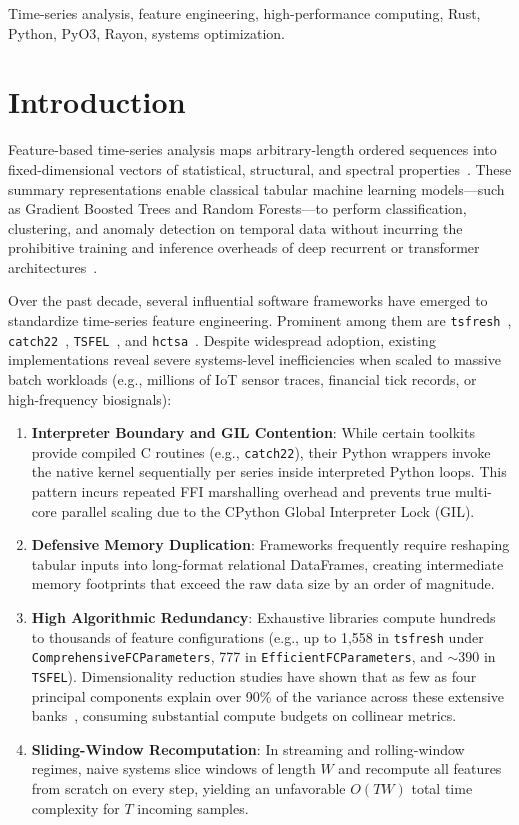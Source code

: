 \documentclass[conference]{IEEEtran}
\newcommand{\tsfresh}{\texttt{tsfresh}}
\newcommand{\catchtwentytwo}{\texttt{catch22}}
\newcommand{\tsfel}{\texttt{TSFEL}}
\newcommand{\hctsa}{\texttt{hctsa}}
\begin{document}
\begin{IEEEkeywords}
Time-series analysis, feature engineering, high-performance computing, Rust, Python, PyO3, Rayon, systems optimization.
\end{IEEEkeywords}

\section{Introduction}
\label{sec:introduction}
Feature-based time-series analysis maps arbitrary-length ordered sequences into fixed-dimensional vectors of statistical, structural, and spectral properties~\cite{fulcher2014highly}. These summary representations enable classical tabular machine learning models---such as Gradient Boosted Trees and Random Forests---to perform classification, clustering, and anomaly detection on temporal data without incurring the prohibitive training and inference overheads of deep recurrent or transformer architectures~\cite{dau2019ucr}.

Over the past decade, several influential software frameworks have emerged to standardize time-series feature engineering. Prominent among them are \tsfresh{}~\cite{christ2018tsfresh}, \catchtwentytwo{}~\cite{lubba2019catch22}, \tsfel{}~\cite{barandas2020tsfel}, and \hctsa{}~\cite{fulcher2014highly}. Despite widespread adoption, existing implementations reveal severe systems-level inefficiencies when scaled to massive batch workloads (e.g., millions of IoT sensor traces, financial tick records, or high-frequency biosignals):
\begin{enumerate}
    \item \textbf{Interpreter Boundary and GIL Contention}: While certain toolkits provide compiled C routines (e.g., \catchtwentytwo{}), their Python wrappers invoke the native kernel sequentially per series inside interpreted Python loops. This pattern incurs repeated FFI marshalling overhead and prevents true multi-core parallel scaling due to the CPython Global Interpreter Lock (GIL).
    \item \textbf{Defensive Memory Duplication}: Frameworks frequently require reshaping tabular inputs into long-format relational DataFrames, creating intermediate memory footprints that exceed the raw data size by an order of magnitude.
    \item \textbf{High Algorithmic Redundancy}: Exhaustive libraries compute hundreds to thousands of feature configurations (e.g., up to 1,558 in \tsfresh{} under \texttt{ComprehensiveFCParameters}, 777 in \texttt{EfficientFCParameters}, and $\sim$390 in \tsfel{}). Dimensionality reduction studies have shown that as few as four principal components explain over 90\% of the variance across these extensive banks~\cite{barandas2020tsfel}, consuming substantial compute budgets on collinear metrics.
    \item \textbf{Sliding-Window Recomputation}: In streaming and rolling-window regimes, naive systems slice windows of length $W$ and recompute all features from scratch on every step, yielding an unfavorable $O(TW)$ total time complexity for $T$ incoming samples.
\end{enumerate}
\end{document}

